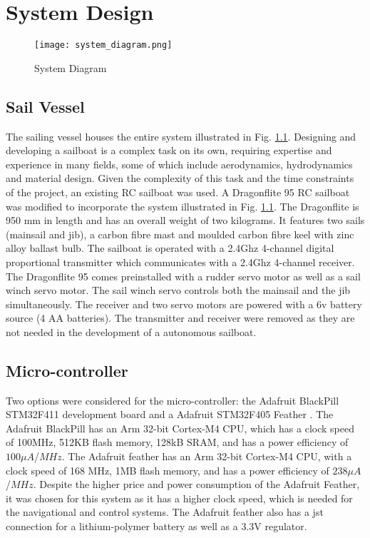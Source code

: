 \graphicspath{{system_design/fig/}}

\chapter{System Design}
\label{chap:system_design}

\begin{figure}[!h]
  \centering
  \texttt{[image: system\_diagram.png]}
  \caption[System Diagram]{System Diagram}
  \label{fig:system_diagram}
\end{figure}

\section{Sail Vessel}
The sailing vessel houses the entire system illustrated in Fig. \ref{fig:system_diagram}. Designing and developing a sailboat is a complex task on its own, 
requiring expertise and experience in many fields, some of which include aerodynamics, hydrodynamics and material design. Given the complexity of this task 
and the time constraints of the project, an existing RC sailboat was used. A Dragonflite 95 RC sailboat\cite{Dragonflite} was modified to incorporate the system illustrated 
in Fig. \ref{fig:system_diagram}. The Dragonflite is 950 mm in length and has an overall weight of two kilograms. It features two sails (mainsail and jib),  
a carbon fibre mast and moulded carbon fibre keel with zinc alloy ballast bulb. The sailboat is operated
with a 2.4Ghz 4-channel digital proportional transmitter which communicates with a 2.4Ghz 4-channel receiver. The Dragonflite 95 comes preinstalled with a rudder 
servo motor as well as a sail winch servo motor. The sail winch servo controls both the mainsail 
and the jib simultaneously. The receiver and two servo motors are powered with a 6v battery source (4 AA batteries). The transmitter and receiver were 
removed as they are not needed in the development of a autonomous sailboat.

\section{Micro-controller}
Two options were considered for the micro-controller: the Adafruit BlackPill STM32F411 development board \cite{black_pill} and a Adafruit STM32F405 Feather \cite{STM32F405-specs}.
 The Adafruit BlackPill
has an Arm 32-bit Cortex-M4 CPU, which has a clock speed of 100MHz, 512KB flash memory, 128kB SRAM, and has a power efficiency
of $100\mu A$/$MHz$. The Adafruit feather has an Arm 32-bit Cortex-M4 CPU, with a clock speed of 168 MHz, 1MB flash memory, 
and has a power efficiency of $238\mu A$/$MHz$. Despite the higher price and power consumption of the Adafruit Feather, it was chosen for this system as it has a 
higher clock speed, which is needed for the navigational and control systems. The Adafruit feather also has a jst connection for a lithium-polymer battery as well as a 
3.3V regulator.


